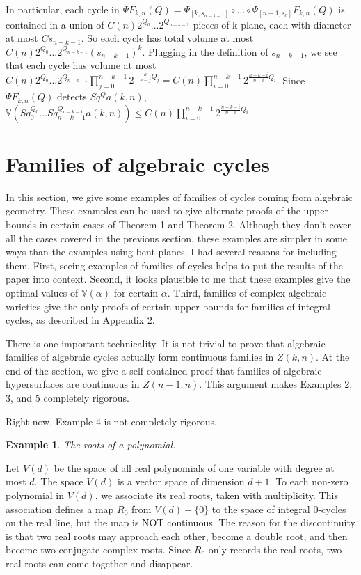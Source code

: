 \documentclass{amsart}
\newtheorem*{Theorem 1}{Theorem 1}
\newtheorem*{Theorem 2}{Theorem 2}
\newtheorem*{Theorem 1A}{Theorem 1A}
\newtheorem*{Theorem 2A}{Theorem 2A}
\newtheorem{example}{Example}
\newtheorem*{vanishing lemma}{Vanishing Lemma}
\numberwithin{equation}{section}
\begin{document}
In particular, each cycle in $\Psi F_{k,n}(Q) = 
\Psi_{[k, s_{n-k-1}]} \circ ... \circ \Psi_{[n-1, s_0]} F_{k,n}(Q)$ is contained in a union
of $C(n) 2^{Q_0} ... 2^{Q_{n-k-1}}$ pieces of k-plane,
each with diameter at most $C s_{n-k-1}$.  So each cycle has total volume
at most $C(n) 2^{Q_0} ... 2^{Q_{n-k-1}} (s_{n-k-1})^k$.  Plugging in the
definition of $s_{n-k-1}$, we see that each cycle has volume at most
$C(n) 2^{Q_0} ...2^{Q_{n-k-1}} \prod_{j=0}^{n-k-1} 2^{- \frac{k}{n-j} Q_j} 
= C(n) \prod_{i=0}^{n-k-1} 2^{\frac{n-k-i}{n-i} Q_i}$.  Since $\Psi F_{k,n}(Q)$
detects $Sq^Q a(k,n)$, $\mathbb{V}(Sq_0^{Q_0} ... Sq_{n-k-1}^{Q_{n-k-1}}
a(k,n)) \le C(n) \prod_{i=0}^{n-k-1} 2^{\frac{n-k-i}{n-i} Q_i}$. \endproof

\section{Families of algebraic cycles}

In this section, we give some examples of families of cycles
coming from algebraic geometry.  These examples can be used to
give alternate proofs of the upper bounds in certain cases of
Theorem 1 and Theorem 2.
Although they don't cover all the cases covered in the previous
section, these examples are simpler in some ways than the
examples using bent planes.  I had several reasons for
including them.  First, seeing examples of
families of cycles helps to put the results of the paper into
context.  Second, it looks plausible to me that
these examples give the optimal values of $\mathbb{V(\alpha)}$
for certain $\alpha$.  Third, families of complex algebraic
varieties give the only proofs of certain upper bounds for
families of integral cycles, as described in Appendix 2.

There is one important technicality.  It is not trivial to prove
that algebraic families of algebraic cycles actually form
continuous families in $Z(k,n)$.  At the end of the section, we
give a self-contained proof that families of algebraic
hypersurfaces are continuous in $Z(n-1,n)$.  This argument makes
Examples 2, 3, and 5 completely rigorous. 

Right now, Example 4 is not completely rigorous.

\begin{example} The roots of a polynomial.
\end{example}

Let $V(d)$ be the space of all real polynomials of one variable with
degree at most $d$.  The space $V(d)$ is a vector space of
dimension $d+1$.  To each non-zero polynomial in $V(d)$, we
associate its real roots, taken with multiplicity.  This
association defines a map $R_0$ from $V(d) - \{ 0 \}$ to the space
of integral 0-cycles on the real line, but the map is NOT
continuous.  The reason for the discontinuity is that two real
roots may approach each other, become a double root, and then
become two conjugate complex roots.  Since $R_0$ only records the
real roots, two real roots can come together and disappear.
\end{document}
